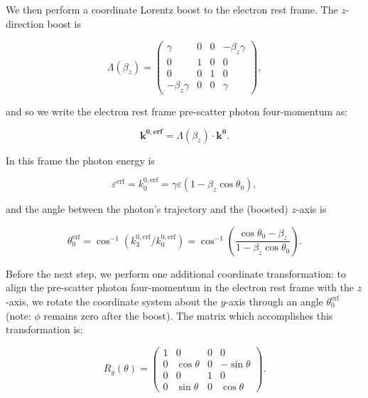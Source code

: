 \documentclass[letterpaper]{article}
\begin{document}
\begin{enumerate}
We then perform a coordinate Lorentz boost to the electron rest frame. The $z$-direction boost is

\begin{equation}
\Lambda(\beta_z) =
\begin{pmatrix}
\gamma & 0 & 0 & -\beta_z \gamma \\
0 & 1 & 0 & 0 \\
0 & 0 & 1 & 0 \\
-\beta_z \gamma & 0 & 0 & \gamma
\end{pmatrix},
\end{equation}

\noindent and so we write the electron rest frame pre-scatter photon four-momentum as:

\begin{equation}
\mathbf{k^{0, erf}} = \Lambda(\beta_z) \cdot \mathbf{k^0}.
\end{equation}

\noindent In this frame the photon energy is

\begin{equation}
\varepsilon^\mathrm{erf} = k^{0,\mathrm{erf}}_0 = \gamma \varepsilon (1 - \beta_z \cos \theta_0),
\end{equation}

\noindent and the angle between the photon's trajectory and the (boosted) $z$-axis is

\begin{equation}
\theta^\mathrm{erf}_0 = \cos^{-1} (k^{0,\mathrm{erf}}_3/k^{0,\mathrm{erf}}_0) = \cos^{-1} \left(\frac{\cos \theta_0 - \beta_z}{1 - \beta_z \cos \theta_0}\right).
\end{equation}

Before the next step, we perform one additional coordinate transformation: to align the pre-scatter photon four-momentum in the electron rest frame with the $z$-axis, we rotate the coordinate system about the $y$-axis through an angle $\theta^\mathrm{erf}_0$ (note: $\phi$ remains zero after the boost). The matrix which accomplishes this transformation is:

\begin{equation}
R_y (\theta) =
\begin{pmatrix}
1 & 0 & 0 & 0 \\
0 & \cos \theta & 0 & - \sin \theta \\
0 & 0 & 1 & 0 \\
0 & \sin \theta & 0 & \cos \theta
\end{pmatrix}.
\end{equation}


\end{enumerate}
\end{document}
